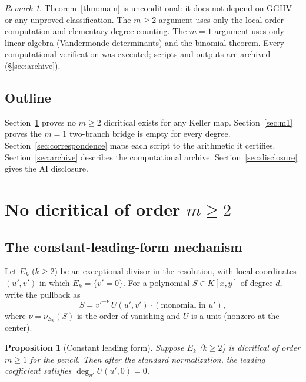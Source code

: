 \documentclass[a4paper,11pt]{article}
\theoremstyle{plain}
\newtheorem{proposition}[theorem]{Proposition}
\theoremstyle{definition}
\theoremstyle{remark}
\newtheorem{remark}[theorem]{Remark}
\begin{document}
\begin{remark}\label{rem:status}
Theorem~\ref{thm:main} is unconditional: it does not depend on GGHV~\cite{GGHV} or any unproved classification. The $m\geq 2$ argument uses only the local order computation and elementary degree counting. The $m=1$ argument uses only linear algebra (Vandermonde determinants) and the binomial theorem. Every computational verification was executed; scripts and outputs are archived (\S\ref{sec:archive}).
\end{remark}

\subsection{Outline}

Section~\ref{sec:high-order} proves no $m\geq 2$ dicritical exists for any Keller map. Section~\ref{sec:m1} proves the $m=1$ two-branch bridge is empty for every degree. Section~\ref{sec:correspondence} maps each script to the arithmetic it certifies. Section~\ref{sec:archive} describes the computational archive. Section~\ref{sec:disclosure} gives the AI disclosure.

\section{No dicritical of order \texorpdfstring{$m\geq 2$}{m>=2}}\label{sec:high-order}

\subsection{The constant-leading-form mechanism}

Let $E_k$ ($k\geq 2$) be an exceptional divisor in the resolution, with local coordinates $(u',v')$ in which $E_k=\{v'=0\}$. For a polynomial $S\in K[x,y]$ of degree $d$, write the pullback as
\begin{equation}\label{eq:pullback}
S = {v'}^{-\nu}\,U(u',v')\cdot(\text{monomial in }u'),
\end{equation}
where $\nu=\nu_{E_k}(S)$ is the order of vanishing and $U$ is a unit (nonzero at the center).

\begin{proposition}[Constant leading form]\label{prop:constant-form}
Suppose $E_k$ ($k\geq 2$) is dicritical of order $m\geq 1$ for the pencil. Then after the standard normalization, the leading coefficient satisfies $\deg_{u'} U(u',0)=0$.
\end{proposition}
\end{document}
